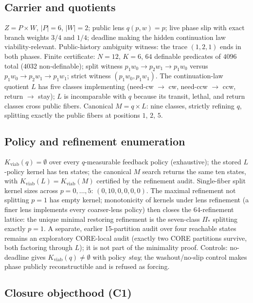 \documentclass[11pt]{article}
\newcommand{\Kviab}{K_{\mathrm{viab}}}
\theoremstyle{definition}
\begin{document}
\subsection{Carrier and quotients}

$Z = P \times W$, $|P| = 6$, $|W| = 2$; public lens $q(p,w) = p$; live phase
slip with exact branch weights $3/4$ and $1/4$; deadline making the hidden
continuation law viability-relevant. Public-history ambiguity witness: the
trace $(1,2,1)$ ends in both phases. Finite certificate: $N = 12$, $K = 6$,
$64$ definable predicates of $4096$ total ($4032$ non-definable); split
witness $p_1w_0 \to p_2w_1 \to p_1w_0$ versus $p_1w_0 \to p_2w_1 \to p_1w_1$;
strict witness $(p_1w_0, p_1w_1)$. The continuation-law quotient $L$ has five
classes implementing (need-cw $\to$ cw, need-ccw $\to$ ccw, return $\to$
stay); $L$ is incomparable with $q$ because its transit, lethal, and return
classes cross public fibers. Canonical $M = q \times L$: nine classes,
strictly refining $q$, splitting exactly the public fibers at positions
$1$, $2$, $5$.

\subsection{Policy and refinement enumeration}

$\Kviab(q) = \emptyset$ over every $q$-measurable feedback policy
(exhaustive); the stored $L$-policy kernel has ten states; the canonical
$M$ search returns the same ten states, with $\Kviab(L) = \Kviab(M)$
certified by the refinement audit. Single-fiber split kernel sizes across
$p = 0,\dots,5$: $(0, 10, 0, 0, 0, 0)$. The maximal refinement not splitting
$p{=}1$ has empty kernel; monotonicity of kernels under lens refinement (a
finer lens implements every coarser-lens policy) then closes the
$64$-refinement lattice: the unique minimal restoring refinement is the
seven-class $\Pi_*$ splitting exactly $p{=}1$. A separate, earlier 15-partition
audit over four reachable states remains an exploratory CORE-local audit
(exactly two CORE partitions survive, both factoring through $L$); it is not
part of the minimality proof. Controls: no-deadline gives
$\Kviab(q) \neq \emptyset$ with policy \emph{stay}; the washout/no-slip
control makes phase publicly reconstructible and is refused as forcing.

\subsection{Closure objecthood (C1)}
\end{document}
